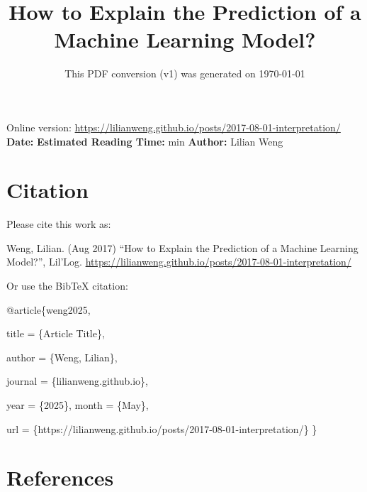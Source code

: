 \documentclass[12pt]{article}
\title{How to Explain the Prediction of a Machine Learning Model?}
\date{This PDF conversion (v1) was generated on \today\footnotemark}
\begin{document}
\maketitle
\begin{center}
    Online version: \url{https://lilianweng.github.io/posts/2017-08-01-interpretation/} \\
    \textbf{Date:} \quad
    \textbf{Estimated Reading Time:}  min \quad
    \textbf{Author:} Lilian Weng
\end{center}




\newpage
\tableofcontents
\newpage
\vspace{1em}
\n\n\n\section{Citation}
Please cite this work as:

\begin{tcolorbox}[colback=black!5!white, colframe=black!80!white, boxrule=0.5pt, arc=2mm, left=1mm, right=1mm, top=1mm, bottom=1mm]
  Weng, Lilian. (Aug 2017) ``How to Explain the Prediction of a Machine Learning Model?'', Lil'Log. \url{https://lilianweng.github.io/posts/2017-08-01-interpretation/}
  \end{tcolorbox}

Or use the BibTeX citation:

\begin{tcolorbox}[
    colback=black!5!white,
    colframe=black!80!white,
    boxrule=0.5pt,
    arc=2mm,
    left=1mm,
    right=1mm,
    top=1mm,
    bottom=1mm,
    listing only,
    listing options={
      basicstyle=\ttfamily\footnotesize,
      breaklines=true,
      literate={\{}{{\char`\{}}1 {\}}{{\char`\}}}1
    }
  ]
  @article\{weng2025,

    title   = \{Article Title\},

    author  = \{Weng, Lilian\},

    journal = \{lilianweng.github.io\},

    year    = \{2025\},
    month   = \{May\},

    url     = \{https://lilianweng.github.io/posts/2017-08-01-interpretation/\}\n
  \}
  \end{tcolorbox}

\newpage
\section{References}

\n
\end{document}
